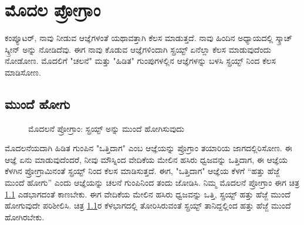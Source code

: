 \chapter{ಮೊದಲ ಪ್ರೋಗ್ರಾಂ}
ಕಂಪ್ಯೂಟರ್, ನಾವು ನೀಡುವ ಆಜ್ಞೆಗಳಂತೆ ಯಥಾವತ್ತಾಗಿ ಕೆಲಸ ಮಾಡುತ್ತದೆ.  ನಾವು ಹಿಂದಿನ ಅಧ್ಯಾಯದಲ್ಲಿ ಸ್ಕ್ರಾಚ್ ಸ್ಕ್ರೀನ್ ಅನ್ನು ನೋಡಿದೆವು. ಈಗ ನಾವು ಕೊಡುವ ಆಜ್ಞೆಗಳಿಂದಾಗಿ ಸ್ಪ್ರಯ್ಟ್  ಏನೆಲ್ಲಾ ಕೆಲಸ ಮಾಡುವುದೆಂದು ನೋಡೋಣ.  ಮೊದಲಿಗೆ "ಚಲನೆ" ಮತ್ತು "ಹಿಡಿತ" ಗುಂಪುಗಳಲ್ಲಿನ  ಆಜ್ಞೆಗಳನ್ನು ಬಳಸಿ ಸ್ಪ್ರಯ್ಟ್ ನಿಂದ ಕೆಲಸ ಮಾಡಿಸೋಣ. 



\section{ಮುಂದೆ ಹೋಗು}
\begin{figure}[h]
\begin{center}
\begin{multicols}{2}
\begin{Scratch}[1]
\beginbox{}
\end{Scratch}

\end{multicols}
\end{center}

\caption{ಮೊದಲನೆ ಪ್ರೋಗ್ರಾಂ: ಸ್ಪ್ರಯ್ಟ್  ಅನ್ನು ಮುಂದೆ ಹೋಗಿಸುವುದು}
\label{program1}
\end{figure}

\vspace{-0.5cm}
ಮೊದಲನೆಯದಾಗಿ ಹಿಡಿತ ಗುಂಪಿನ "ಒತ್ತಿದಾಗ" ಎಂಬ ಆಜ್ಞೆಯನ್ನು ಪ್ರೊಗ್ರಾಂ ತಯಾರಿಯ ಜಾಗದಲ್ಲಿರಿಸೋಣ.  ಈ ಆಜ್ಞೆ ಏನು ಮಾಡುವುದೆಂದರೆ,  ನೀವು ಮೌಸ್ನಿಂದ ವೇದಿಕೆಯ ಮೇಲಿನ ಹಸಿರು ಧ್ವಜವನ್ನು ಒತ್ತಿದಾಗ, ಈ ಆಜ್ಞೆಯ ಕೆಳಗಿನ ಪ್ರೋಗ್ರಾಮಿನಂತೆ ಸ್ಪ್ರಯ್ಟ್ ನಿಂದ ಕೆಲಸ ಮಾಡಿಸುತ್ತದೆ. ಈಗ, "ಒತ್ತಿದಾಗ" ಆಜ್ಞೆಯ ಕೆಳಗೆ “ಹತ್ತು ಹೆಜ್ಜೆ ಮುಂದೆ ಹೋಗು” ಎಂದು ಆಜ್ಞೆಯನ್ನು ಚಲನೆ ಗುಂಪಿನಿಂದ ತಂದು ಜೋಡಿಸಿ.  ನಿಮ್ಮ ಮೊದಲನೆ ಪ್ರೋಗ್ರಾಂ ಈಗ ಚಿತ್ರ \ref{program1}  ಎಡಭಾಗದಂತೆ ಕಾಣಬೇಕು.  ಈಗ ವೇದಿಕೆಯ ಮೇಲಿನ ಹಸಿರು ಧ್ವಜವನ್ನು ಒತ್ತಿ,  ಸ್ಪ್ರಯ್ಟ್ ಹತ್ತು ಹೆಜ್ಜೆ ಮುಂದೆ ಹೋಗುವುದೇ ಪರಿಶೀಲಿಸಿ.  ಚಿತ್ರ \ref{program1}ರ ಕೆಳಭಾಗದಲ್ಲಿ ತೋರಿಸಿರುವಂತೆ ಸ್ಪ್ರಯ್ಟ್ ತಾನಿದ್ದಲ್ಲಿಂದ ಹತ್ತು ಹೆಜ್ಜೆ ಮುಂದೆ ಹೋಗಿರಬೇಕು. 

